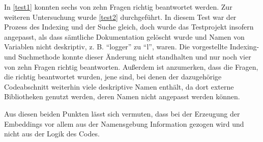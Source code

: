 \documentclass[../main.tex]{subfiles}
\begin{document}
In \ref{test1} konnten sechs von zehn Fragen richtig beantwortet werden.
Zur weiteren Untersuchung wurde \ref{test2} durchgeführt.
In diesem Test war der Prozess des Indexing und der Suche gleich, doch wurde das Testprojekt insofern angepasst, als dass sämtliche Dokumentation gelöscht wurde und Namen von Variablen nicht deskriptiv, z. B. \enquote{logger} zu \enquote{l}, waren.
Die vorgestellte Indexing- und Suchmethode konnte dieser Änderung nicht standhalten und nur noch vier von zehn Fragen richtig beantworten.
Außerdem ist anzumerken, dass die Fragen, die richtig beantwortet wurden, jene sind, bei denen der dazugehörige Codeabschnitt weiterhin viele deskriptive Namen enthält, da dort externe Bibliotheken genutzt werden, deren Namen nicht angepasst werden können.


Aus diesen beiden Punkten lässt sich vermuten, dass bei der Erzeugung der Embeddings vor allem aus der Namensgebung Information gezogen wird und nicht aus der Logik des Codes.
\end{document}

